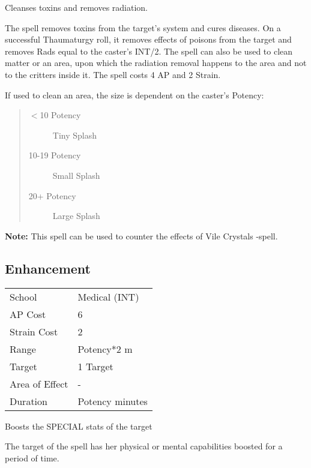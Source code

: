 \documentclass[11pt,a4paper,twocolumn]{book}
\begin{document}
\medskip

Cleanses toxins and removes radiation.

The spell removes toxins from the target's system and cures diseases. On a successful Thaumaturgy roll, it removes effects of poisons from the target and removes Rads equal to the caster's INT/2. The spell can also be used to clean matter or an area, upon which the radiation removal happens to the area and not to the critters inside it.
The spell costs 4 AP and 2 Strain.

If used to clean an area, the size is dependent on the caster's Potency:

\begin{quote}
	\begin{description}
		\item[$<$10 Potency] 	Tiny Splash
		\item[10-19 Potency] 	Small Splash
		\item[20+ Potency] 	Large Splash
	\end{description}
\end{quote}

\textbf{Note:} This spell can be used to counter the effects of Vile Crystals -spell.

\vfill

\subsection*{Enhancement}
{
	\begin{tabu} to 75mm{| X[l,4] | X[l,7] |}
		\hline
		School 			& Medical (INT) 		\\
		AP Cost	      	& 6 					\\
		Strain Cost     & 2 					\\
		Range     		& Potency*2 m			\\
		Target      	& 1 Target				\\
		Area of Effect  & -  	 				\\
		Duration     	& Potency minutes 		\\ \hline
	\end{tabu}
	
}

\medskip

Boosts the SPECIAL stats of the target

The target of the spell has her physical or mental capabilities boosted for a period of time.
\end{document}
